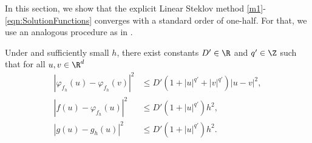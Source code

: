  
 In this section, we show that the explicit Linear Steklov method 
 \eqref{m1}-\eqref{eqn:SolutionFunctions} converges  with a standard order of one-half. For that,
 we use an analogous procedure as in \cite{Higham2002b}.
 
\begin{lem}
	Under  and sufficiently small $h$, there exist
	constants $D'\in \R$ and $q'\in \Z$ such that for all $u,v\in \R^d$
	\begin{align}
		|
			\varphi_{f_h}(u)
			-\varphi_{f_h}(v)
		|^2 
		&\leq
			D'
			\left(
				1 +|u|^{q'} +|v|^{q'}
			\right)
			|u-v|^2, \\
		|
			 f(u) -\varphi_{f_h}(u)
		|^2 
		&\leq
			D'
			\left(
				1 +|u|^{q'} 
				\right)
			h^2, \\
		|
			g(u) -g_h(u)
		|^2 				 
		&\leq
			D'
			\left(
				1 +|u|^{q'} 
			\right)
			h^2 . \label{eqn:ghPolyGrowth}
	\end{align}
\end{lem}

